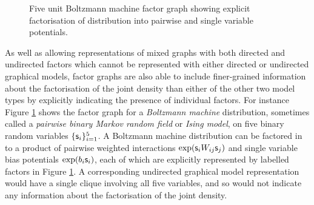 \begin{figure}[!t]
\caption[Boltzmann machine factor graph.]{Five unit Boltzmann machine factor graph showing explicit factorisation of distribution into pairwise and single variable potentials.}
\label{fig:boltzmann-machine-factor-graph}
\end{figure}

As well as allowing representations of mixed graphs with both directed and undirected factors which cannot be represented with either directed or undirected graphical models, factor graphs are also able to include finer-grained information about the factorisation of the joint density than either of the other two model types by explicitly indicating the presence of individual factors. For instance Figure \ref{fig:boltzmann-machine-factor-graph} shows the factor graph for a \emph{Boltzmann machine} distribution, sometimes called a \emph{pairwise binary Markov random field} or \emph{Ising model}, on five binary random variables $\lbrace \mathsf{s}_i \rbrace_{i=1}^5$. A Boltzmann machine distribution can be factored in to a product of pairwise weighted interactions $\exp(\mathsf{s}_i W_{ij} \mathsf{s}_j)$ and single variable bias potentials $\exp(b_i \mathsf{s}_i)$, each of which are explicitly represented by labelled factors in Figure \ref{fig:boltzmann-machine-factor-graph}. A corresponding undirected graphical model representation would have a single clique involving all five variables, and so would not indicate any information about the factorisation of the joint density.


